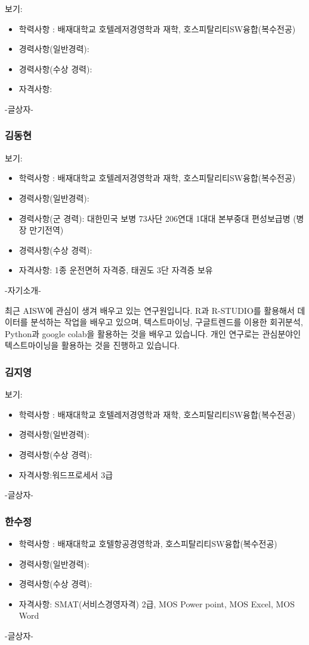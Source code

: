 \documentclass[
]{article}
\providecommand{\tightlist}{%
  \setlength{\itemsep}{0pt}\setlength{\parskip}{0pt}}
\begin{document}
보기:

\begin{itemize}
\tightlist
\item
  학력사항 : 배재대학교 호텔레저경영학과 재학,
  호스피탈리티SW융합(복수전공)
\item
  경력사항(일반경력):
\item
  경력사항(수상 경력):
\item
  자격사항:
\end{itemize}

-글상자-

\hypertarget{uxae40uxb3d9uxd604}{%
\subsubsection{김동현}\label{uxae40uxb3d9uxd604}}

보기:

\begin{itemize}
\tightlist
\item
  학력사항 : 배재대학교 호텔레저경영학과 재학,
  호스피탈리티SW융합(복수전공)
\item
  경력사항(일반경력):
\item
  경력사항(군 경력): 대한민국 보병 73사단 206연대 1대대 본부중대
  편성보급병 (병장 만기전역)
\item
  경력사항(수상 경력):
\item
  자격사항: 1종 운전면허 자격증, 태권도 3단 자격증 보유
\end{itemize}

-자기소개-

최근 AISW에 관심이 생겨 배우고 있는 연구원입니다. R과 R-STUDIO를
활용해서 데이터를 분석하는 작업을 배우고 있으며, 텍스트마이닝,
구글트렌드를 이용한 회귀분석, Python과 google colab을 활용하는 것을
배우고 있습니다. 개인 연구로는 관심분야인 텍스트마이닝을 활용하는 것을
진행하고 있습니다.

\hypertarget{uxae40uxc9c0uxc601}{%
\subsubsection{김지영}\label{uxae40uxc9c0uxc601}}

보기:

\begin{itemize}
\tightlist
\item
  학력사항 : 배재대학교 호텔레저경영학과 재학,
  호스피탈리티SW융합(복수전공)
\item
  경력사항(일반경력):
\item
  경력사항(수상 경력):
\item
  자격사항:워드프로세서 3급
\end{itemize}

-글상자-

\hypertarget{uxd55cuxc218uxc815}{%
\subsubsection{한수정}\label{uxd55cuxc218uxc815}}

\begin{itemize}
\tightlist
\item
  학력사항 : 배재대학교 호텔항공경영학과, 호스피탈리티SW융합(복수전공)
\item
  경력사항(일반경력):
\item
  경력사항(수상 경력):
\item
  자격사항: SMAT(서비스경영자격) 2급, MOS Power point, MOS Excel, MOS
  Word
\end{itemize}

-글상자-
\end{document}
